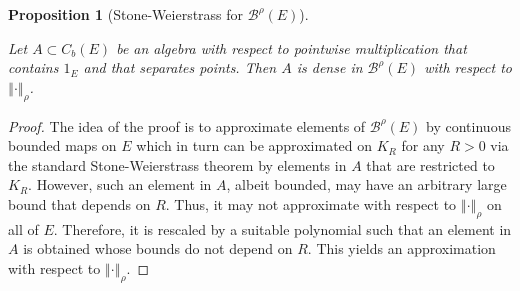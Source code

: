 \documentclass[a4paper,12pt]{article}
\newtheorem{proposition}[theorem]{Proposition}
\theoremstyle{definition}
\theoremstyle{remark}
\numberwithin{equation}{section}
\numberwithin{theorem}{section}
\begin{document}
\begin{proposition}[Stone-Weierstrass for $\mathcal{\mathscr{B}}^{\rho}(E)$]
\label{prop:Stone-Weierstrass on B-rho spaces}

Let $A\subset C_{b}(E)$ be an algebra with respect to pointwise multiplication
that contains $1_{E}$ and that separates points. Then $A$ is dense
in $\mathcal{\mathscr{B}}^{\rho}(E)$ with respect to $\left\Vert \cdot\right\Vert _{\rho}$.
\end{proposition}
\begin{proof}
The idea of the proof is to approximate elements of $\mathcal{\mathscr{B}}^{\rho}(E)$
by continuous bounded maps on $E$ which in turn can be approximated
on $K_{R}$ for any $R>0$ via the standard Stone-Weierstrass theorem \cite{stone48} by elements in $A$
that are restricted to $K_{R}$. However, such an element in $A$,
albeit bounded, may have an arbitrary large bound that depends on
$R$. Thus, it may not approximate with respect to $\left\Vert \cdot\right\Vert _{\rho}$
on all of $E$. Therefore, it is rescaled by a suitable polynomial
such that an element in $A$ is obtained whose bounds do not depend
on $R$. This yields an approximation with respect to $\left\Vert \cdot\right\Vert _{\rho}$.


\end{proof}
\end{document}
